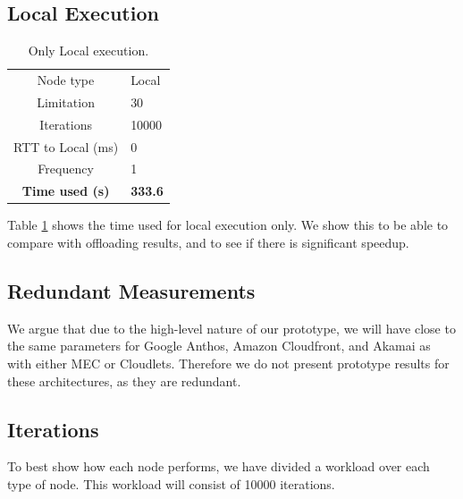 
\subsection{Local Execution}
\begin{table}[h!]
    \centering
    \begin{tabular}[c]{c|p{2cm}}

        Node type & Local \\

        Limitation          & 30  \\

        Iterations          & 10000  \\

        RTT to Local (ms)   & 0  \\

        Frequency           & 1 \\

        \hline
        \textbf{Time used (s)} & \textbf{333.6} \\

    \end{tabular}
    \caption{Only Local execution.}
    \label{tab:local_execution}
\end{table}
Table \ref{tab:local_execution} shows the time used for local execution only. We show this to be able to compare with offloading results, and to see if there is significant speedup.

\subsection{Redundant Measurements}
We argue that due to the high-level nature of our prototype, we will have close to the same parameters for Google Anthos, Amazon Cloudfront, and Akamai as with either MEC or Cloudlets. Therefore we do not present prototype results for these architectures, as they are redundant.

\subsection{Iterations}
To best show how each node performs, we have divided a workload over each type of node. This workload will consist of 10000 iterations.









